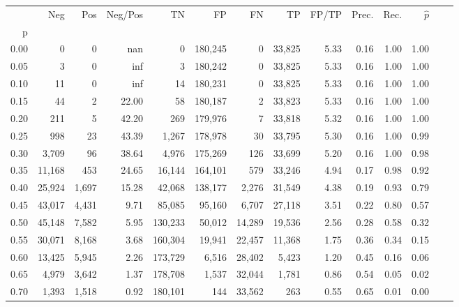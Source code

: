 \begin{tabular}{rrrrrrrrrrrrrr}
\toprule
{} &     Neg &    Pos & Neg/Pos &       TN &       FP &      FN &      TP & FP/TP & Prec. &  Rec. & $\hat{p}$ \\
p    &         &        &         &          &          &         &         &       &       &       &           \\
\midrule
0.00 &       0 &      0 &     nan &        0 &  180,245 &       0 &  33,825 &  5.33 &  0.16 &  1.00 &      1.00 \\
0.05 &       3 &      0 &     inf &        3 &  180,242 &       0 &  33,825 &  5.33 &  0.16 &  1.00 &      1.00 \\
0.10 &      11 &      0 &     inf &       14 &  180,231 &       0 &  33,825 &  5.33 &  0.16 &  1.00 &      1.00 \\
0.15 &      44 &      2 &   22.00 &       58 &  180,187 &       2 &  33,823 &  5.33 &  0.16 &  1.00 &      1.00 \\
0.20 &     211 &      5 &   42.20 &      269 &  179,976 &       7 &  33,818 &  5.32 &  0.16 &  1.00 &      1.00 \\
0.25 &     998 &     23 &   43.39 &    1,267 &  178,978 &      30 &  33,795 &  5.30 &  0.16 &  1.00 &      0.99 \\
0.30 &   3,709 &     96 &   38.64 &    4,976 &  175,269 &     126 &  33,699 &  5.20 &  0.16 &  1.00 &      0.98 \\
0.35 &  11,168 &    453 &   24.65 &   16,144 &  164,101 &     579 &  33,246 &  4.94 &  0.17 &  0.98 &      0.92 \\
0.40 &  25,924 &  1,697 &   15.28 &   42,068 &  138,177 &   2,276 &  31,549 &  4.38 &  0.19 &  0.93 &      0.79 \\
0.45 &  43,017 &  4,431 &    9.71 &   85,085 &   95,160 &   6,707 &  27,118 &  3.51 &  0.22 &  0.80 &      0.57 \\
0.50 &  45,148 &  7,582 &    5.95 &  130,233 &   50,012 &  14,289 &  19,536 &  2.56 &  0.28 &  0.58 &      0.32 \\
0.55 &  30,071 &  8,168 &    3.68 &  160,304 &   19,941 &  22,457 &  11,368 &  1.75 &  0.36 &  0.34 &      0.15 \\
0.60 &  13,425 &  5,945 &    2.26 &  173,729 &    6,516 &  28,402 &   5,423 &  1.20 &  0.45 &  0.16 &      0.06 \\
0.65 &   4,979 &  3,642 &    1.37 &  178,708 &    1,537 &  32,044 &   1,781 &  0.86 &  0.54 &  0.05 &      0.02 \\
0.70 &   1,393 &  1,518 &    0.92 &  180,101 &      144 &  33,562 &     263 &  0.55 &  0.65 &  0.01 &      0.00 \\

\end{tabular}
